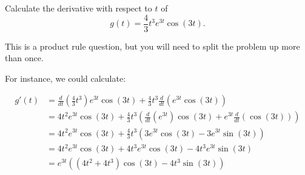 \documentclass{ximera}
\author{Emma Smith Zbarsky}
\begin{document}
\begin{exercise}

Calculate the derivative with respect to $t$ of
\[g(t) = \frac{4}{3}t^3e^{3t}\cos(3t).\]


\begin{hint}
This is a product rule question, but you will need to split the problem
up more than once.
\end{hint}


\begin{hint}
For instance, we could calculate:

\begin{align*}
g'(t) &= \frac{d}{dt}\left(\frac{4}{3}t^3\right)e^{3t}\cos(3t) + \frac{4}{3}t^3\frac{d}{dt}\left(e^{3t}\cos(3t)\right) \\
&= 4t^2e^{3t}\cos(3t) + \frac{4}{3}t^3\left(\frac{d}{dt}\left(e^{3t}\right)\cos(3t) + e^{3t}\frac{d}{dt}\left(\cos(3t)\right)\right) \\
&= 4t^2e^{3t}\cos(3t) + \frac{4}{3}t^3\left(3e^{3t}\cos(3t)-3e^{3t}\sin(3t)\right) \\
&= 4t^2e^{3t}\cos(3t)+4t^3e^{3t}\cos(3t)-4t^3e^{3t}\sin(3t) \\
&= e^{3t}\left((4t^2+4t^3)\cos(3t)-4t^3\sin(3t)\right)
\end{align*}
\end{hint}


\begin{multipleChoice}
\end{multipleChoice}

\end{exercise}
\end{document}
